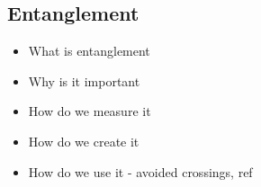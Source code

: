 \documentclass{subfiles}
\begin{document}
\subsection{Entanglement}
\begin{itemize}
    \item What is entanglement
    \item Why is it important
    \item How do we measure it
    \item How do we create it
    \item How do we use it - avoided crossings, ref \cite{nazir2005anticrossings}
\end{itemize}
\end{document}
